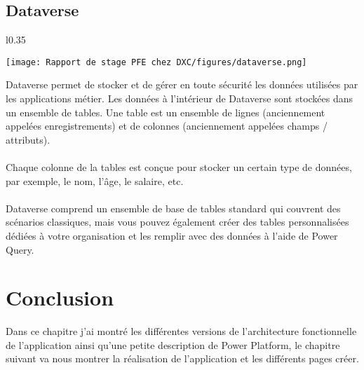 \subsection{Dataverse }

\begin{wrapfigure}{l}{0.35\textwidth}
  \begin{center}
    \texttt{[image: Rapport de stage PFE chez DXC/figures/dataverse.png]}
  \end{center}
\end{wrapfigure}

Dataverse permet de stocker et de gérer en toute sécurité les données utilisées par les applications métier. Les données à l’intérieur de Dataverse sont stockées dans un ensemble de tables. Une table est un ensemble de lignes (anciennement appelées enregistrements) et de colonnes (anciennement appelées champs / attributs). 
\\\\
Chaque colonne de la tables est conçue pour stocker un certain type de données, par exemple, le nom, l’âge, le salaire, etc. 
\\\\
Dataverse comprend un ensemble de base de tables standard qui couvrent des scénarios classiques, mais vous pouvez également créer des tables personnalisées dédiées à votre organisation et les remplir avec des données à l’aide de Power Query. 

\section{Conclusion}
Dans ce chapitre j'ai montré les différentes versions de l'architecture fonctionnelle de l'application ainsi qu'une petite description de Power Platform, le chapitre suivant va nous montrer la réalisation de l'application et les différents pages créer.




